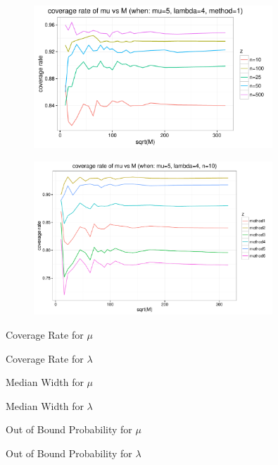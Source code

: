 \documentclass[12pt]{article}
\begin{document}
\begin{figure}[h] 
\includegraphics[width=0.8\textwidth]{findM2.pdf}
\caption{}
\end{figure}

\begin{figure}[h] 
\includegraphics[width=0.8\textwidth]{findM3.pdf}
\caption{}
\end{figure}


\begin{table}[h]
\caption{Coverage Rate for $\mu$}
\end{table}

\begin{table}[h]
\caption{Coverage Rate for $\lambda$}
\end{table}

\begin{table}[h]
\caption{Median Width for $\mu$}
\end{table}

\begin{table}[h]
\caption{Median Width for $\lambda$}
\end{table}

\begin{table}[h]
\caption{Out of Bound Probability for $\mu$}
\end{table}

\begin{table}[h]
\caption{Out of Bound Probability for $\lambda$}
\end{table}
\end{document}

